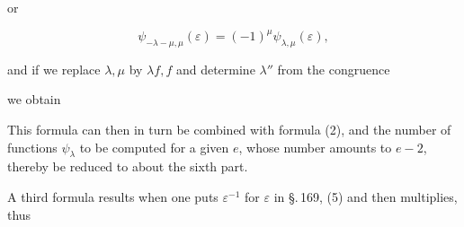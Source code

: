 or

\[
\psi_{-\lambda-\mu,\mu}(\varepsilon) = (-1)^\mu \psi_{\lambda,\mu}(\varepsilon),
\]

and if we replace $\lambda,\mu$ by $\lambda f, f$ and determine $\lambda''$ from the
congruence


we obtain


This formula can then in turn be combined with formula (2),
and the number of functions $\psi_\lambda$ to be computed for a given
$e$, whose number amounts to $e-2$, thereby be reduced to about
the sixth part.

A third formula results when one puts $\varepsilon^{-1}$ for
$\varepsilon$ in \S.\,169, (5) and then multiplies, thus

